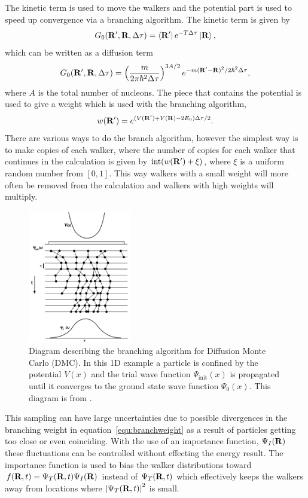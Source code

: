 The kinetic term is used to move the walkers and the potential part is used to speed up convergence via a branching algorithm. The kinetic term is given by
\begin{equation}
   G_0(\mathbf{R}',\mathbf{R},\Delta \tau) = \left< \mathbf{R}' \right|e^{-T\Delta \tau}\left| \mathbf{R} \right>,
\end{equation}
which can be written as a diffusion term
\begin{equation}
   G_0(\mathbf{R}',\mathbf{R},\Delta \tau) = \left(\frac{m}{2\pi\hbar^2\Delta\tau}\right)^{3A/2}e^{-m(\mathbf{R}'-\mathbf{R})^2/2\hbar^2\Delta\tau},
\end{equation}
where $A$ is the total number of nucleons.
The piece that contains the potential is used to give a weight which is used with the branching algorithm,
\begin{equation}
   w(\mathbf{R}') = e^{(V(\mathbf{R}')+V(\mathbf{R})-2E_0)\Delta\tau/2}.
   \label{equ:branchweight}
\end{equation}
There are various ways to do the branch algorithm, however the simplest way is to make copies of each walker, where the number of copies for each walker that continues in the calculation is given by $\mathrm{int}(w(\mathbf{R}')+\xi)$, where $\xi$ is a uniform random number from $[0,1]$. This way walkers with a small weight will more often be removed from the calculation and walkers with high weights will multiply.
\begin{figure}[h!]
   \centering
   \includegraphics[width=0.4\textwidth]{figures/branching.png}
   \caption{Diagram describing the branching algorithm for Diffusion Monte Carlo (DMC). In this 1D example a particle is confined by the potential $V(x)$ and the trial wave function $\Psi_\text{init}(x)$ is propagated until it converges to the ground state wave function $\Psi_0(x)$. This diagram is from \cite{foulkes2001}.}
   \label{fig:branching}
\end{figure}

This sampling can have large uncertainties due to possible divergences in the branching weight in equation~\ref{equ:branchweight} as a result of particles getting too close or even coinciding. With the use of an importance function, $\Psi_I(\mathbf{R})$ these fluctuations can be controlled without effecting the energy result. The importance function is used to bias the walker distributions toward $f(\mathbf{R},t) = \Psi_T(\mathbf{R},t)\Psi_I(\mathbf{R})$ instead of $\Psi_T(\mathbf{R},t)$ which effectively keeps the walkers away from locations where $\left|\Psi_T(\mathbf{R},t)\right|^2$ is small.

